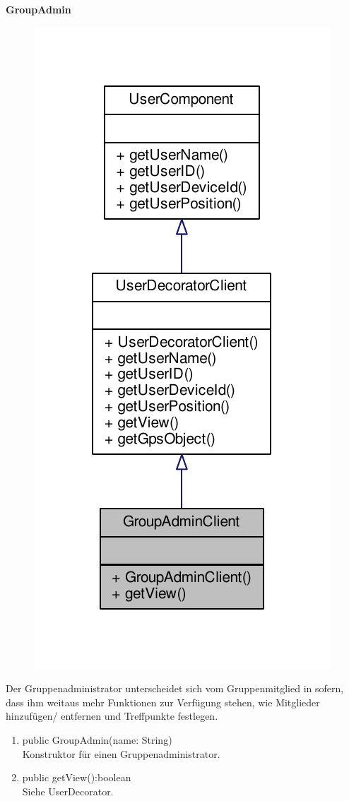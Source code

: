 \textbf{GroupAdmin}
\begin{figure}[H]
	\includegraphics[scale = 1]{res/umlClasses/group_admin_client__coll__graph.pdf}
	\centering
\end{figure}
Der Gruppenadministrator unterscheidet sich vom Gruppenmitglied in sofern, dass ihm weitaus mehr Funktionen zur Verfügung stehen, wie Mitglieder hinzufügen/ entfernen und Treffpunkte festlegen.
\begin{enumerate}
	\item public GroupAdmin(name: String)\\
		Konstruktor für einen Gruppenadministrator.
	\item public getView():boolean\\
		Siehe UserDecorator.
\end{enumerate}

